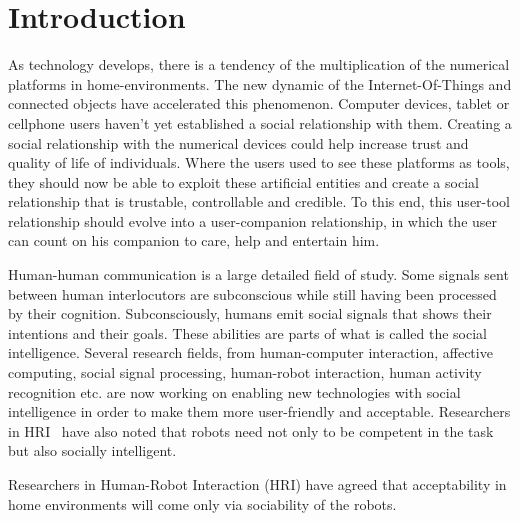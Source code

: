 \documentclass[a4paper,twocolumn]{svjour3}
\begin{document}
\section{Introduction}
\label{sec:introduction}
As technology develops, there is a tendency of the multiplication of the numerical platforms in home-environments. 
The new dynamic of the Internet-Of-Things and connected objects have accelerated this phenomenon. 
Computer devices, tablet or cellphone users haven't yet established a social relationship with them. 
Creating a social relationship with the numerical devices could help increase trust and quality of life of individuals.
Where the users used to see these platforms as tools, they should now be able to exploit these artificial entities and create a social relationship that is trustable, controllable and credible. 
To this end, this user-tool relationship should evolve into a user-companion relationship, in which the user can count on his companion to care, help and entertain him.

Human-human communication is a large detailed field of study. 
Some signals sent between human interlocutors are subconscious while still having been processed by their cognition.
Subconsciously, humans emit social signals that shows their intentions and their goals.
These abilities are parts of what is called the social intelligence.
Several research fields, from human-computer interaction, affective computing, social signal processing, human-robot interaction, human activity recognition etc. are now working on enabling new technologies with social intelligence in order to make them more user-friendly and acceptable.
Researchers in HRI~\cite{Tapus2007,Dautenhahn2007} have also noted that robots need not only to be competent in the task but also socially intelligent.

Researchers in Human-Robot Interaction (HRI) have agreed that acceptability in home environments will come only via sociability %
of the robots.
\end{document}
